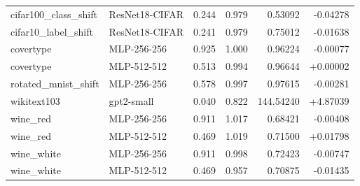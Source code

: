 {\begin{longtable}{llrrrr}
cifar100\_class\_shift & ResNet18-CIFAR & 0.244 & 0.979 & 0.53092 & -0.04278 \\
cifar10\_label\_shift & ResNet18-CIFAR & 0.241 & 0.979 & 0.75012 & -0.01638 \\
covertype & MLP-256-256 & 0.925 & 1.000 & 0.96224 & -0.00077 \\
covertype & MLP-512-512 & 0.513 & 0.994 & 0.96644 & +0.00002 \\
rotated\_mnist\_shift & MLP-256-256 & 0.578 & 0.997 & 0.97615 & -0.00281 \\
wikitext103 & gpt2-small & 0.040 & 0.822 & 144.54240 & +4.87039 \\
wine\_red & MLP-256-256 & 0.911 & 1.017 & 0.68421 & -0.00408 \\
wine\_red & MLP-512-512 & 0.469 & 1.019 & 0.71500 & +0.01798 \\
wine\_white & MLP-256-256 & 0.911 & 0.998 & 0.72423 & -0.00747 \\
wine\_white & MLP-512-512 & 0.469 & 0.957 & 0.70875 & -0.01435 \\
\bottomrule\end{longtable}}
